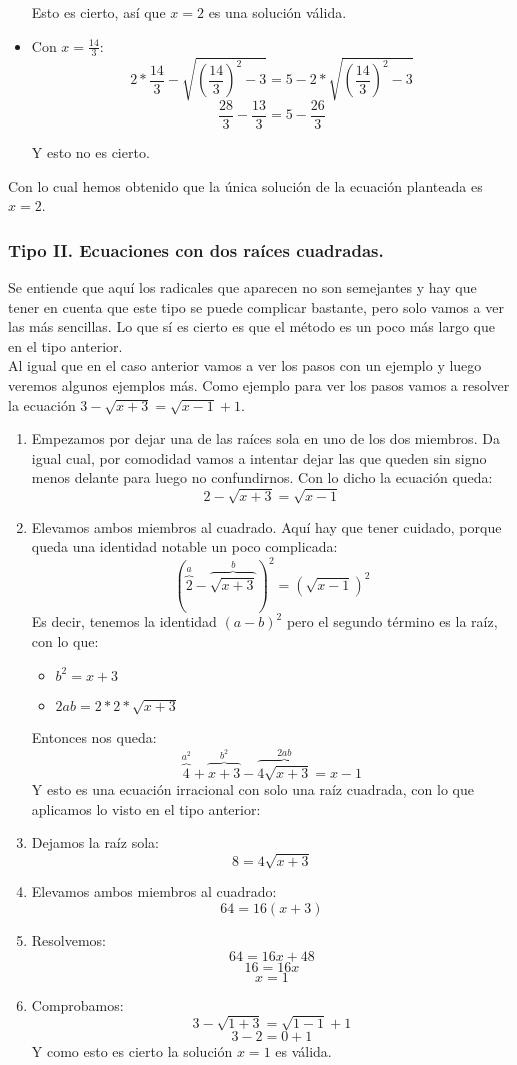 \documentclass[a4paper,11pt,answers]{exam}
\begin{document}
\begin{questions}
\begin{solution}
\begin{itemize}
      Esto es cierto, así que $x = 2$ es una solución válida.
    \item Con $x = \frac{14}{3}$:
      \[2*\frac{14}{3} - \sqrt{\left(\frac{14}{3}\right)^2 - 3} =
        5- 2* \sqrt{\left(\frac{14}{3}\right)^2 - 3}\]
      \[\frac{28}{3} - \frac{13}{3} = 5 - \frac{26}{3}\]
      
      Y esto no es cierto.
    \end{itemize}

    Con lo cual hemos obtenido que la única solución de la ecuación planteada es $x = 2$.
  \end{solution}
\end{questions}

\subsubsection{Tipo II. Ecuaciones con dos raíces cuadradas.}
Se entiende que aquí los radicales que aparecen no son semejantes y hay que tener en cuenta que
este tipo se puede complicar bastante, pero solo vamos a ver las más sencillas. Lo que sí es cierto
es que el método es un poco más largo que en el tipo anterior.\\
Al igual que en el caso anterior vamos a ver los pasos con un ejemplo y luego veremos algunos
ejemplos más. Como ejemplo para ver los pasos vamos a resolver la ecuación $3 - \sqrt{x + 3} =
\sqrt{x - 1} + 1$.
\begin{enumerate}
\item Empezamos por dejar una de las raíces sola en uno de los dos miembros. Da igual cual, por comodidad vamos a intentar dejar las que queden sin signo menos delante para luego no confundirnos. Con lo
  dicho la ecuación queda:
  \[2 - \sqrt{x + 3} =\sqrt{x - 1}\]
\item Elevamos ambos miembros al cuadrado. Aquí hay que tener cuidado, porque queda una identidad notable un poco complicada:
  \[\left(\overbrace{2}^a - \overbrace{\sqrt{x + 3}}^b \right)^2 =\left( \sqrt{x - 1} \right)^2\]
  Es decir, tenemos la identidad $(a-b)^2$ pero el segundo término es la raíz, con lo que:
  \begin{itemize}
  \item $b^2 = x+3$
  \item $2ab = 2*2*\sqrt{x+3}$
  \end{itemize}
  Entonces nos queda:
  \[\overbrace{4}^{a^2} + \overbrace{x + 3}^{b^2} - \overbrace{4\sqrt{x+3}}^{2ab} = x-1\]
  Y esto es una ecuación irracional con solo una raíz cuadrada, con lo que aplicamos lo visto en
  el tipo anterior:
\item Dejamos la raíz sola:
  \[8 = 4\sqrt{x + 3}\]
\item Elevamos ambos miembros al cuadrado:
  \[64 = 16(x+3)\]
\item Resolvemos:
  \[64 = 16 x + 48\]
  \[16 = 16 x\]
  \[x = 1\]
\item Comprobamos:
  \[3 - \sqrt{1 + 3} = \sqrt{1 - 1} + 1\]
  \[3 - 2 = 0 + 1\]
  Y como esto es cierto la solución $x = 1$ es válida.
\end{enumerate}
\end{document}
